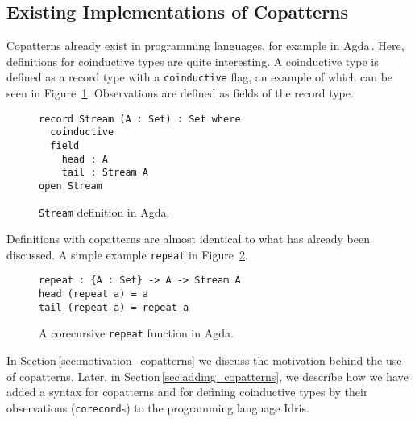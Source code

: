 \subsection{Existing Implementations of Copatterns}
Copatterns already exist in programming languages, for example in
Agda\,\cite{Norell:thesis}. Here, definitions for coinductive types are quite
interesting. A coinductive type is defined as a record type with a
\texttt{coinductive} flag, an example of which can be seen in
Figure~\ref{fig:agda_stream}. Observations are defined as fields of the record
type.

\begin{figure}[h]
\begin{lstlisting}[mathescape]
record Stream (A : Set) : Set where
  coinductive
  field
    head : A
    tail : Stream A
open Stream
\end{lstlisting}
\caption{\texttt{Stream} definition in Agda.}
\label{fig:agda_stream}
\end{figure}

Definitions with copatterns are almost identical to what has already been
discussed. A simple example \texttt{repeat} in Figure~\ref{fig:agda_repeat}. 

\begin{figure}[h]
\begin{lstlisting}[mathescape]
repeat : {A : Set} -> A -> Stream A
head (repeat a) = a
tail (repeat a) = repeat a 
\end{lstlisting}
\caption{A corecursive \texttt{repeat} function in Agda.}
\label{fig:agda_repeat}
\end{figure}

In Section\,\ref{sec:motivation_copatterns} we discuss the motivation behind the
use of copatterns. Later, in Section\,\ref{sec:adding_copatterns}, we describe
how we have added a syntax for copatterns and for defining coinductive types by
their observations (\texttt{corecord}s) to the programming language Idris.
